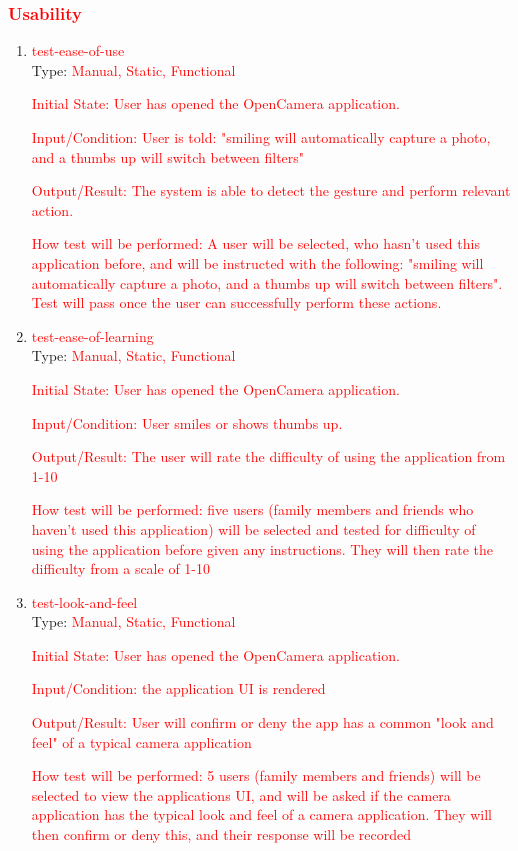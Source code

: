\documentclass[12pt, titlepage]{article}
\begin{document}
\subsubsection{\textcolor{red}{Usability}}
\begin{enumerate}

\item{\textcolor{red}{test-ease-of-use}\\}
Type: \textcolor{red}{Manual, Static, Functional}
					
\textcolor{red}{Initial State: User has opened the OpenCamera application.}
				
\textcolor{red}{Input/Condition: User is told: "smiling will automatically capture a photo, and a thumbs up will switch between filters"}
					
\textcolor{red}{Output/Result: The system is able to detect the gesture and perform relevant action.}
					
\textcolor{red}{How test will be performed: A user will be selected, who hasn't used this application before, and will be instructed with the following: "smiling will automatically capture a photo, and a thumbs up will switch between filters". Test will pass once the user can successfully perform these actions.}

\item{\textcolor{red}{test-ease-of-learning}\\}
Type: \textcolor{red}{Manual, Static, Functional}
					
\textcolor{red}{Initial State: User has opened the OpenCamera application.}
				
\textcolor{red}{Input/Condition: User smiles or shows thumbs up.}
					
\textcolor{red}{Output/Result: The user will rate the difficulty of using the application from 1-10}
					
\textcolor{red}{How test will be performed: five users (family members and friends who haven't used this application) will be selected and tested for difficulty of using the application before given any instructions. They will then rate the difficulty from a scale of 1-10}

\item{\textcolor{red}{test-look-and-feel}\\}
Type: \textcolor{red}{Manual, Static, Functional}
					
\textcolor{red}{Initial State: User has opened the OpenCamera application.}
				
\textcolor{red}{Input/Condition: the application UI is rendered }
					
\textcolor{red}{Output/Result: User will confirm or deny the app has a common "look and feel" of a typical camera application}
					
\textcolor{red}{How test will be performed: 5 users (family members and friends) will be selected to view the applications UI, and will be asked if the camera application has the typical look and feel of a camera application. They will then confirm or deny this, and their response will be recorded}
\end{enumerate}
\end{document}

